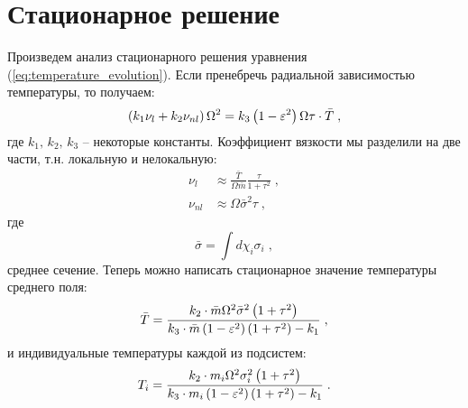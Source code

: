 \section{Стационарное решение}
Произведем анализ стационарного решения уравнения (\ref{eq:temperature_evolution}). Если пренебречь радиальной зависимостью
температуры, то получаем:
\begin{equation}
    \left(k_1\nu_{l}+k_2\nu_{nl}\right)\Omega^2=k_3\left(1-\varepsilon^2\right)\Omega\tau\cdot\bar{T}\;,
\end{equation}
где $k_1,\,k_2,\,k_3$ -- некоторые константы. Коэффициент вязкости мы разделили на две части, т.н. локальную и нелокальную:
\begin{equation}
    \begin{split}
        \nu_{l}&\approx\frac{\bar{T}}{\Omega\bar{m}}\frac{\tau}{1+\tau^2}\;,\\
        \nu_{nl}&\approx\Omega\bar{\sigma}^2\tau\;,
    \end{split}
\end{equation}
где
\begin{equation}
  \bar{\sigma}=\int d\chi_i\sigma_i\;,
\end{equation}
среднее сечение. Теперь можно написать стационарное значение температуры среднего поля:
\begin{equation}
    \bar{T} = \frac{k_2\cdot\bar{m}\Omega^2\bar{\sigma}^2\left(1+\tau^2\right)}{k_3\cdot\bar{m}\left(1-\varepsilon^2\right)\left(1+\tau^2\right)-k_1}\;,
\end{equation}
и индивидуальные температуры каждой из подсистем:
\begin{equation}
    T_i = \frac{k_2\cdot m_i\Omega^2\sigma_i^2\left(1+\tau^2\right)}{k_3\cdot m_i\left(1-\varepsilon^2\right)\left(1+\tau^2\right)-k_1}\;.
\end{equation}




